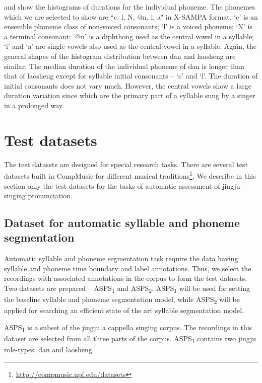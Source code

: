  and  show the histograms of durations for the individual phoneme. The phonemes which we are selected to show are ``c, l, N, @n, i, a" in X-SAMPA format. `c' is an ensemble phoneme class of non-voiced consonants; `l' is a voiced phoneme; `N' is a terminal consonant; `@n' is a diphthong used as the central vowel in a syllable; `i' and `a' are single vowels also used as the central vowel in a syllable. Again, the general shapes of the histogram distribution between \gls{dan} and \gls{laosheng} are similar. The median duration of the individual phoneme of \gls{dan} is longer than that of \gls{laosheng} except for syllable initial consonants -- `c' and `l'. The duration of initial consonants does not vary much. However, the central vowels show a large duration variation since which are the primary part of a syllable sung by a singer in a prolonged way.

\section{Test datasets}\label{sec:ch4:test_datasets}
The test datasets are designed for special research tasks. There are several test datasets built in CompMusic for different musical traditions\footnote{\url{http://compmusic.upf.edu/datasets}}. We describe in this section only the test datasets for the tasks of automatic assessment of jingju singing pronunciation.

\subsection{Dataset for automatic syllable and phoneme segmentation}\label{sec:ch4:dataset_segmentation}

Automatic syllable and phoneme segmentation task require the data having syllable and phoneme time boundary and label annotations. Thus, we select the recordings with associated annotations in the corpus to form the test datasets. Two datasets are prepared -- ASPS\textsubscript{1} and ASPS\textsubscript{2}. ASPS\textsubscript{1} will be used for setting the baseline syllable and phoneme segmentation model, while ASPS\textsubscript{2} will be applied for searching an efficient state of the art syllable segmentation model.

ASPS\textsubscript{1} is a subset of the jingju a cappella singing corpus. The recordings in this dataset are selected from all three parts of the corpus. ASPS\textsubscript{1} contains two jingju role-types: \gls{dan} and \gls{laosheng}. 

